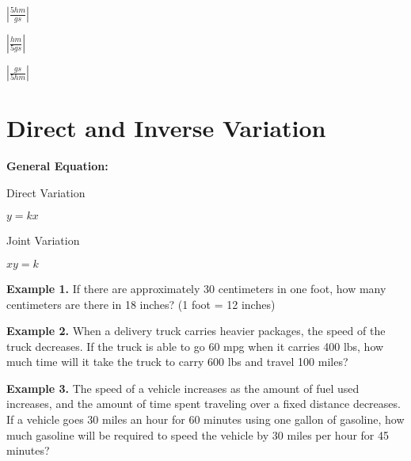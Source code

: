 \begin{multicols*}{2}
\begin{outline}[enumerate]
\begin{enumerate}[label=(\Alph*)]
\begin{multicols}{2}
\item $\left|\frac{5hm}{gs}\right|$
\item $\left|\frac{hm}{5gs}\right|$
\item $\left|\frac{gs}{5hm}\right|$
\end{multicols}
\end{enumerate}
\end{outline}

\end{multicols*}
\section{Direct and Inverse Variation}

\bigskip
\textbf{General Equation:} 

\begin{center}
\setlength{\columnseprule}{0pt}
\begin{multicols}{2}
Direct Variation

$y=kx$

\columnbreak
Joint Variation

$xy=k$
\end{multicols}
\end{center}

\vfill
\textbf{Example 1.} If there are approximately 30 centimeters in one foot, how many centimeters are there in 18 inches? (1 foot = 12 inches)

\vfill
\textbf{Example 2.}  When a delivery truck carries heavier packages, the speed of the truck decreases. If the truck is able to go 60 mpg when it carries 400 lbs, how much time will it take the truck to carry 600 lbs and travel 100 miles?

\vfill
\textbf{Example 3.} The speed of a vehicle increases as the amount of fuel used increases, and the amount of time spent traveling over a fixed distance decreases. If a vehicle goes 30 miles an hour for 60 minutes using one gallon of gasoline, how much gasoline will be required to speed the vehicle by 30 miles per hour for 45 minutes?

